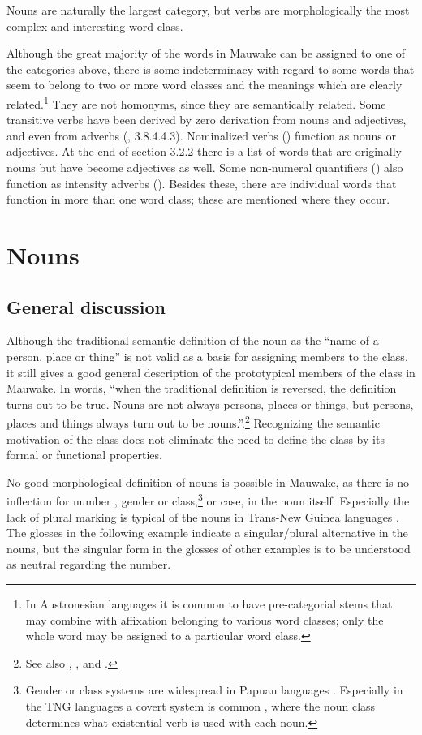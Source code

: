 Nouns are naturally the largest category, but verbs are morphologically the most complex and interesting word class.

Although the great majority of the words in Mauwake can be assigned to one of the categories above, there is some indeterminacy with regard to some words that seem to belong to two or more word classes and the meanings which are clearly related.\footnote{In Austronesian languages it is common to have pre-categorial stems that may combine with affixation belonging to various word classes; only the whole word may be assigned to a particular word class.} They are not homonyms, since they are semantically related. Some transitive verbs have been derived by zero derivation from nouns and adjectives, and even from adverbs (, 3.8.4.4.3). Nominalized verbs () function as nouns or adjectives. At the end of section 3.2.2 there is a list of words that are originally nouns but have become adjectives as well. Some non-numeral quantifiers () also function as intensity adverbs (). Besides these, there are individual words that function in more than one word class; these are mentioned where they occur.

\section{Nouns}\label{sec:3:2}
{}
\subsection{General discussion}\label{sec:3:2:1}
{}
Although the traditional semantic definition of the noun as the ``name of a person, place or thing'' is not valid as a basis for assigning members to the class, it still gives a good general description of the prototypical members of the class in Mauwake. In  words, ``when the traditional definition is reversed, the definition turns out to be true. Nouns are not always persons, places or things, but persons, places and things always turn out to be nouns.''.\footnote{See also \citet[117]{Sapir1921}, \citet[60]{Jespersen1924}, \citet[449]{Lyons1977} and \citet[7]{Schachter1985}.} Recognizing the semantic motivation of the class does not eliminate the need to define the class by its formal or functional properties.

No good morphological definition of nouns is possible in Mauwake, as there is no inflection for number , gender or class,\footnote{Gender or class systems are widespread in Papuan languages \citep[77]{Foley1986}. Especially in the TNG languages a covert system is common \citep[58]{Wurm1982}, where the noun class determines what existential verb is used with each noun.} or case, in the noun itself. Especially the lack of plural marking is typical of the nouns in Trans-New Guinea languages \citep[36]{Wurm1982}. The glosses in the following example indicate a singular/plural alternative in the nouns, but the singular form in the glosses of other examples is to be understood as neutral regarding the number. 

